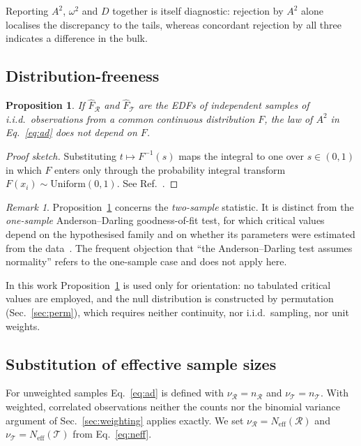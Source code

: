 \documentclass[11pt,a4paper]{article}
\theoremstyle{definition}
\theoremstyle{plain}
\newtheorem{proposition}{Proposition}[section]
\theoremstyle{remark}
\newtheorem{remark}{Remark}[section]
\newcommand{\Neff}{N_{\mathrm{eff}}}
\newcommand{\Rr}{\mathcal{R}}
\newcommand{\Tt}{\mathcal{T}}
\begin{document}
Reporting $A^2$, $\omega^2$ and $D$ together is itself diagnostic: rejection by
$A^2$ alone localises the discrepancy to the tails, whereas concordant rejection
by all three indicates a difference in the bulk.

\subsection{Distribution-freeness}

\begin{proposition}
\label{prop:df}
If $\hat{F}_\Rr$ and $\hat{F}_\Tt$ are the EDFs of independent samples of
i.i.d.\ observations from a common continuous distribution $F$, the law of
$A^{2}$ in Eq.~\eqref{eq:ad} does not depend on $F$.
\end{proposition}

\begin{proof}[Proof sketch]
Substituting $t \mapsto F^{-1}(s)$ maps the integral to one over $s \in (0,1)$
in which $F$ enters only through the probability integral transform
$F(x_i) \sim \mathrm{Uniform}(0,1)$. See Ref.~\cite{Pettitt1976}.
\end{proof}

\begin{remark}
Proposition~\ref{prop:df} concerns the \emph{two-sample} statistic. It is
distinct from the \emph{one-sample} Anderson--Darling goodness-of-fit test, for
which critical values depend on the hypothesised family and on whether its
parameters were estimated from the data~\cite{Stephens1974}. The frequent
objection that ``the Anderson--Darling test assumes normality'' refers to the
one-sample case and does not apply here.
\end{remark}

In this work Proposition~\ref{prop:df} is used only for orientation: no
tabulated critical values are employed, and the null distribution is constructed
by permutation (Sec.~\ref{sec:perm}), which requires neither continuity, nor
i.i.d.\ sampling, nor unit weights.

\subsection{Substitution of effective sample sizes}
\label{sec:neffsub}

For unweighted samples Eq.~\eqref{eq:ad} is defined with $\nu_\Rr = n_\Rr$ and
$\nu_\Tt = n_\Tt$. With weighted, correlated observations neither the counts nor
the binomial variance argument of Sec.~\ref{sec:weighting} applies exactly. We
set $\nu_\Rr = \Neff(\Rr)$ and $\nu_\Tt = \Neff(\Tt)$ from
Eq.~\eqref{eq:neff}.
\end{document}
